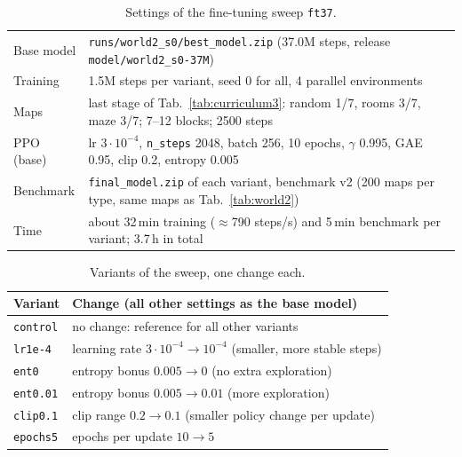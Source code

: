 \documentclass[11pt,a4paper]{article}
\newcommand{\code}[1]{\texttt{#1}}
\begin{document}
\begin{table}[H]
      \centering\small
      \begin{tabularx}{\textwidth}{@{}l X@{}}
            \toprule
            Base model     & \code{runs/world2\_s0/best\_model.zip} (37.0M steps, release \code{model/world2\_s0-37M})                        \\
            Training       & 1.5M steps per variant, seed 0 for all, 4 parallel environments                                                  \\
            Maps           & last stage of Tab.~\ref{tab:curriculum3}: random 1/7, rooms 3/7, maze 3/7; 7--12 blocks; 2500 steps          \\
            PPO (base)     & lr $3\cdot10^{-4}$, \code{n\_steps} 2048, batch 256, 10 epochs, $\gamma$ 0.995, GAE 0.95, clip 0.2, entropy 0.005 \\
            Benchmark      & \code{final\_model.zip} of each variant, benchmark v2 (200 maps per type, same maps as Tab.~\ref{tab:world2})  \\
            Time           & about 32\,min training ($\approx$790 steps/s) and 5\,min benchmark per variant; 3.7\,h in total               \\
            \bottomrule
      \end{tabularx}
      \caption{Settings of the fine-tuning sweep \code{ft37}.}
      \label{tab:ftsetup}
\end{table}

\begin{table}[H]
      \centering\small
      \begin{tabular}{@{}l l@{}}
            \toprule
            Variant            & Change (all other settings as the base model)                       \\
            \midrule
            \code{control}     & no change: reference for all other variants                         \\
            \code{lr1e-4}      & learning rate $3\cdot10^{-4}\to10^{-4}$ (smaller, more stable steps) \\
            \code{ent0}        & entropy bonus $0.005\to0$ (no extra exploration)                    \\
            \code{ent0.01}     & entropy bonus $0.005\to0.01$ (more exploration)                     \\
            \code{clip0.1}     & clip range $0.2\to0.1$ (smaller policy change per update)           \\
            \code{epochs5}     & epochs per update $10\to5$                                          \\
            \bottomrule
      \end{tabular}
      \caption{Variants of the sweep, one change each.}
      \label{tab:ftvariants}
\end{table}
\end{document}
